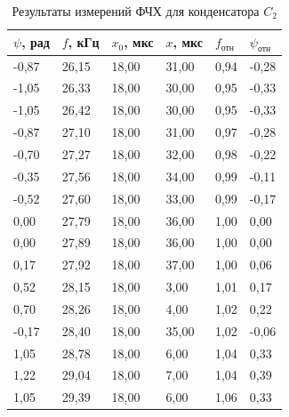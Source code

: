 \begin{table}[H]
    \centering
    \caption{Результаты измерений ФЧХ для конденсатора $C_2$}
    \begin{tabular}{|l|l|l|l|l|l|}
    \hline
        $\psi$, рад & $f$, кГц & $x_0$, мкс & $x$, мкс & $f_{\text{отн}}$ & $\psi_{\text{отн}}$ \\ \hline
        -0,87 & 26,15 & 18,00 & 31,00 & 0,94 & -0,28 \\ \hline
        -1,05 & 26,33 & 18,00 & 30,00 & 0,95 & -0,33 \\ \hline
        -1,05 & 26,42 & 18,00 & 30,00 & 0,95 & -0,33 \\ \hline
        -0,87 & 27,10 & 18,00 & 31,00 & 0,97 & -0,28 \\ \hline
        -0,70 & 27,27 & 18,00 & 32,00 & 0,98 & -0,22 \\ \hline
        -0,35 & 27,56 & 18,00 & 34,00 & 0,99 & -0,11 \\ \hline
        -0,52 & 27,60 & 18,00 & 33,00 & 0,99 & -0,17 \\ \hline
        0,00 & 27,79 & 18,00 & 36,00 & 1,00 & 0,00 \\ \hline
        0,00 & 27,89 & 18,00 & 36,00 & 1,00 & 0,00 \\ \hline
        0,17 & 27,92 & 18,00 & 37,00 & 1,00 & 0,06 \\ \hline
        0,52 & 28,15 & 18,00 & 3,00 & 1,01 & 0,17 \\ \hline
        0,70 & 28,26 & 18,00 & 4,00 & 1,02 & 0,22 \\ \hline
        -0,17 & 28,40 & 18,00 & 35,00 & 1,02 & -0,06 \\ \hline
        1,05 & 28,78 & 18,00 & 6,00 & 1,04 & 0,33 \\ \hline
        1,22 & 29,04 & 18,00 & 7,00 & 1,04 & 0,39 \\ \hline
        1,05 & 29,39 & 18,00 & 6,00 & 1,06 & 0,33 \\ \hline
    \end{tabular}
\end{table}
